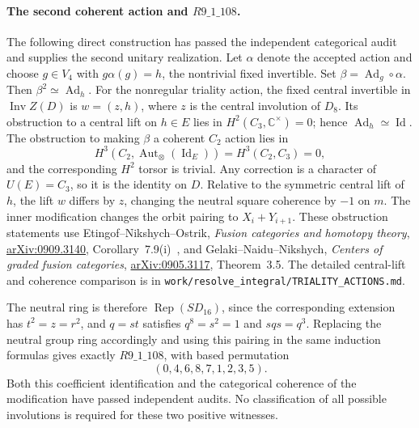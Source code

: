 \paragraph[The second coherent action and R9-1-108]{The second coherent action and $R9\_1\_108$.}
The following direct construction has passed the independent categorical
audit and supplies the second unitary realization.
Let $\alpha$ denote the accepted action and choose $g\in V_4$ with
$g\alpha(g)=h$, the nontrivial fixed invertible.  Set
$\beta=\operatorname{Ad}_g\circ\alpha$.  Then
$\beta^2\simeq\operatorname{Ad}_h$.
For the nonregular triality action, the fixed central invertible in
$\operatorname{Inv}Z(D)$ is $w=(z,h)$, where $z$ is the central involution
of $D_8$.  Its obstruction to a central lift on $h\in E$ lies in
$H^2(C_3,\mathbb C^\times)=0$; hence $\operatorname{Ad}_h\simeq\operatorname{Id}$.
The obstruction to making $\beta$ a coherent $C_2$ action lies in
\[
 H^3(C_2,\operatorname{Aut}_\otimes(\operatorname{Id}_E))
 =H^3(C_2,C_3)=0,
\]
and the corresponding $H^2$ torsor is trivial.  Any correction is a
character of $U(E)=C_3$, so it is the identity on $D$.
Relative to the symmetric central lift of $h$, the lift $w$ differs by
$z$, changing the neutral square coherence by $-1$ on $m$.  The inner
modification changes the orbit pairing to $X_i+Y_{i+1}$.
These obstruction statements use Etingof--Nikshych--Ostrik,
\emph{Fusion categories and homotopy theory},
\href{https://arxiv.org/abs/0909.3140}{arXiv:0909.3140},
Corollary~7.9(i)~\cite{ENOHomotopy},
and Gelaki--Naidu--Nikshych,
\emph{Centers of graded fusion categories},
\href{https://arxiv.org/abs/0905.3117}{arXiv:0905.3117}, Theorem~3.5.
The detailed central-lift and coherence comparison is in
\nolinkurl{work/resolve_integral/TRIALITY_ACTIONS.md}.

The neutral ring is therefore $\operatorname{Rep}(SD_{16})$, since the
corresponding extension has $t^2=z=r^2$, and $q=st$ satisfies
$q^8=s^2=1$ and $sqs=q^3$.
Replacing the neutral group ring accordingly and using this
pairing in the same induction formulas gives exactly $R9\_1\_108$,
with based permutation
\[
 (0,4,6,8,7,1,2,3,5).
\]
Both this coefficient identification and the categorical coherence of the
modification have passed independent audits. No classification of all
possible involutions is required for these two positive witnesses.
